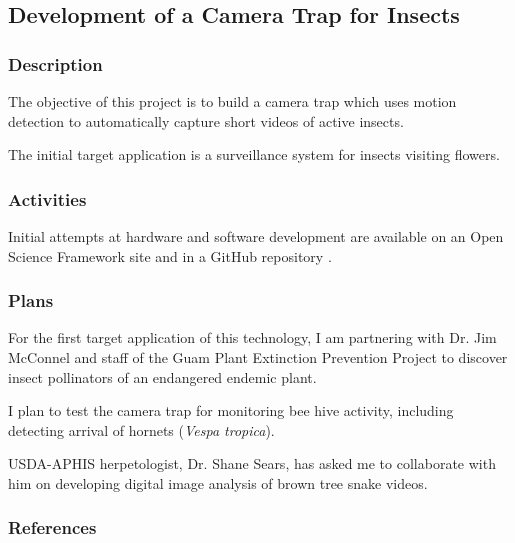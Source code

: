 \begin{comment}
\raggedright\vspace{2mm}\textbf{Activity}
\begin{itemize}
\item Progress on this project blocked by GovGuam beaurocracy. No progress
to report. \newpage{}
\end{itemize}
\end{btUnit}

\begin{btUnit}
\end{comment}


\subsection{Development of a Camera Trap for Insects}
\begin{refsection}
\subsubsection{Description}

The objective of this project is to build a camera trap which uses motion detection to automatically capture short videos of active insects.

The initial target application is a surveillance system for insects visiting flowers.

\subsubsection{Activities}

Initial attempts at hardware and software development are available on an Open Science Framework site \cite{moore_development_2019} and in a GitHub repository \cite{moore_github_2019-2}.

\subsubsection{Plans}

For the first target application of this technology, I am partnering with Dr. Jim McConnel and staff of the Guam Plant Extinction Prevention Project to discover insect pollinators of an endangered endemic plant.

I plan to test the camera trap for monitoring bee hive activity, including detecting arrival of hornets (\textit{Vespa tropica}).

USDA-APHIS herpetologist, Dr. Shane Sears, has asked me to collaborate with him on developing digital image analysis of brown tree snake videos.

\subsubsection{References}
\printbibliography[heading=none]
\end{refsection}

